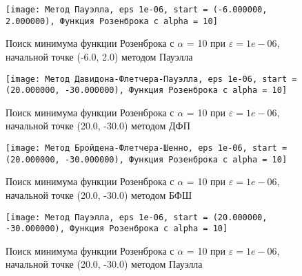             \begin{figure}[H]
	        \centering
	        \texttt{[image: Метод Пауэлла, eps 1e-06, start = (-6.000000, 2.000000), Функция Розенброка с alpha = 10]}%
	        \caption{Поиск минимума функции Розенброка с $\alpha$ = 10 при $\varepsilon = 1e-06$, начальной точке (-6.0, 2.0) методом Пауэлла}
	        \vspace*{-1.2cm}
            \end{figure}
            
            \begin{figure}[H]
	        \centering
	        \texttt{[image: Метод Давидона-Флетчера-Пауэлла, eps 1e-06, start = (20.000000, -30.000000), Функция Розенброка с alpha = 10]}%
	        \caption{Поиск минимума функции Розенброка с $\alpha$ = 10 при $\varepsilon = 1e-06$, начальной точке (20.0, -30.0) методом ДФП}
	        \vspace*{-1.2cm}
            \end{figure}
            
            \begin{figure}[H]
	        \centering
	        \texttt{[image: Метод Бройдена-Флетчера-Шенно, eps 1e-06, start = (20.000000, -30.000000), Функция Розенброка с alpha = 10]}%
	        \caption{Поиск минимума функции Розенброка с $\alpha$ = 10 при $\varepsilon = 1e-06$, начальной точке (20.0, -30.0) методом БФШ}
	        \vspace*{-1.2cm}
            \end{figure}
            
            \begin{figure}[H]
	        \centering
	        \texttt{[image: Метод Пауэлла, eps 1e-06, start = (20.000000, -30.000000), Функция Розенброка с alpha = 10]}%
	        \caption{Поиск минимума функции Розенброка с $\alpha$ = 10 при $\varepsilon = 1e-06$, начальной точке (20.0, -30.0) методом Пауэлла}
	        \vspace*{-1.2cm}
            \end{figure}
            